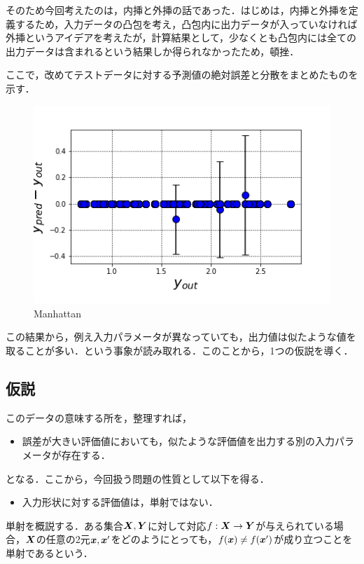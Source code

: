 \documentclass[16.7pt]{jsarticle}
\begin{document}
		そのため今回考えたのは，内挿と外挿の話であった．はじめは，内挿と外挿を定義するため，入力データの凸包を考え，凸包内に出力データが入っていなければ外挿というアイデアを考えたが，計算結果として，少なくとも凸包内には全ての出力データは含まれるという結果しか得られなかったため，頓挫．
		
		ここで，改めてテストデータに対する予測値の絶対誤差と分散をまとめたものを示す．
		
		\begin{figure}[h]
			\centering
				\includegraphics[width= 0.5\columnwidth]{./figure/ERR_WITH_VARS2.png}
			\caption{Manhattan}
		\end{figure}
	
		この結果から，例え入力パラメータが異なっていても，出力値は似たような値を取ることが多い．という事象が読み取れる．このことから，1つの仮説を導く．
		\subsection{仮説}
		このデータの意味する所を，整理すれば，
		\begin{itemize}
			\item 誤差が大きい評価値においても，似たような評価値を出力する別の入力パラメータが存在する．
		\end{itemize}
		となる．ここから，今回扱う問題の性質として以下を得る．
		\begin{itemize}
			\item 入力形状に対する評価値は，単射ではない．
		\end{itemize}
		単射を概説する．ある集合$ \boldsymbol{X},\boldsymbol{Y} $に対して対応$ f:\boldsymbol{X}\rightarrow \boldsymbol{Y} $が与えられている場合，$ \boldsymbol{X} $の任意の2元$ \boldsymbol{x},\boldsymbol{x}' $をどのようにとっても，$ f(\boldsymbol{x}) \neq f(\boldsymbol{x}') $が成り立つことを単射であるという．
		
\end{document}
